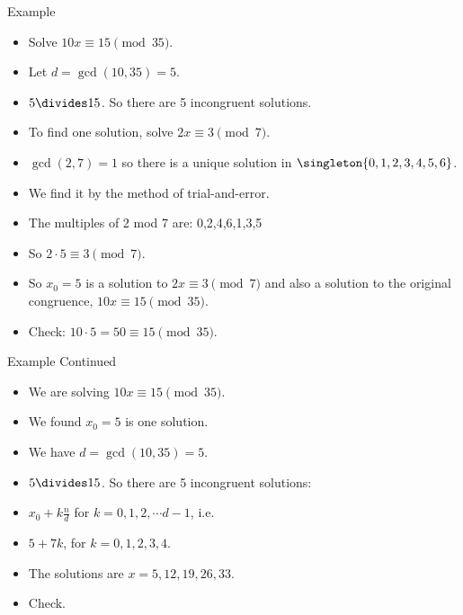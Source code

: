 \documentclass{beamer}
\begin{document}
\begin{frame}{Example}
\begin{itemize}
  \item Solve $10x \equiv 15 \pmod {35}$.
  \item Let $d=\gcd(10,35) = 5$.
  \item $5\divides 15$. So there are 5 incongruent solutions.
  \item To find one solution, solve $2x \equiv 3 \pmod 7$.
  \item $\gcd(2,7) = 1$ so there is a unique solution in $\singleton{0,1,2,3,4,5,6}$.
  \item We find it by the method of trial-and-error.
  \item The multiples of 2 mod 7 are: 0,2,4,6,1,3,5
  \item So $2\cdot 5 \equiv 3 \pmod 7$.
  \item So $x_0=5$ is a solution to $2x \equiv 3 \pmod 7$ and also a solution to the original congruence,
  $10x \equiv 15 \pmod {35}$.
  \item Check: $10\cdot 5 = 50 \equiv 15 \pmod {35}$.
\end{itemize}
\end{frame}


\begin{frame}{Example Continued}
\begin{itemize}
  \item We are solving $10x \equiv 15 \pmod {35}$.
  \item We found $x_0=5$ is one solution.
  \item We have $d=\gcd(10,35) = 5$.
  \item $5\divides 15$. So there are 5 incongruent solutions:
  \item $x_0 + k\frac{n}{d}$ for $k=0,1,2,\cdots d-1$, i.e.
  \item $5 + 7k$, for $k=0,1,2,3,4$.
  \item The solutions are $x=5,12,19,26,33$.
  \item Check.
\end{itemize}
\end{frame}
\end{document}
